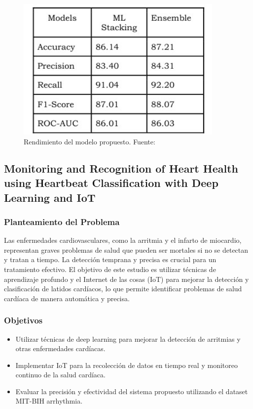 \begin{figure}[H]
    \centering
    \includegraphics[width=0.9\textwidth]{images_repo/METRICASRENDIMIENTO.jpg}
    \caption{Rendimiento del modelo propuesto. Fuente: \cite{jiang2020heart}}
    \label{Rendimiento del modelo propuesto}
\end{figure}


\subsection{Monitoring and Recognition of Heart Health using Heartbeat Classification with Deep Learning and IoT \citep{arulkumar2023monitoring}}

\subsubsection{Planteamiento del Problema}

Las enfermedades cardiovasculares, como la arritmia y el infarto de miocardio, representan graves problemas de salud que pueden ser mortales si no se detectan y tratan a tiempo. La detección temprana y precisa es crucial para un tratamiento efectivo. El objetivo de este estudio es utilizar técnicas de aprendizaje profundo y el Internet de las cosas (IoT) para mejorar la detección y clasificación de latidos cardíacos, lo que permite identificar problemas de salud cardíaca de manera automática y precisa.

\subsubsection{Objetivos}
\begin{itemize}
    \item Utilizar técnicas de deep learning para mejorar la detección de arritmias y otras enfermedades cardíacas.
    \item Implementar IoT para la recolección de datos en tiempo real y monitoreo continuo de la salud cardíaca.
    \item Evaluar la precisión y efectividad del sistema propuesto utilizando el dataset MIT-BIH arrhythmia.
\end{itemize}

